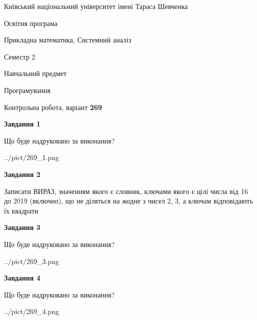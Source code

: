 \documentclass[12pt, ukrainian]{article}
\begin{document}
{{\begin {small}\par
{ \center  Київський національний університет імені Тараса Шевченка \par}
{\parbox {5 cm}{Освітня програма \hfill}{\parbox {8 cm}{Прикладна математика, Системний аналіз \hfill}}\parbox {5 cm}{\hfill Семестр 2}}\par
{\parbox {5 cm} {Навчальний предмет \hfill}\parbox {7 cm}{Програмування \hfill}\parbox {6cm}{\hfill}\par}\vspace{-7pt} \end{small}}{\center Контрольна робота, варіант  \No \textbf
{ 269 }\par}}
{
\begin {large}
{\begin {center}\textbf{Завдання 1}\end {center}}\par
Що буде надруковано за виконання?\par\par
\begin{center}
	{../pict/269_1.png}
\end{center}
\newpage

{\begin {center}\textbf{Завдання 2}\end {center}}\par
Записати ВИРАЗ, значенням якого є словник, ключами якого є цілі числа від 16 до 2019 (включно), що не діляться на жодне з чисел 2, 3, а ключам відповідають їх квадрати\par
\newpage

{\begin {center}\textbf{Завдання 3}\end {center}}\par
Що буде надруковано за виконання?
\begin{center}
	{../pict/269_3.png}
\end{center}
\newpage

{\begin {center}\textbf{Завдання 4}\end {center}}\par
Що буде надруковано за виконання?\par
\begin{center}
	{../pict/269_4.png}
\end{center}
\newpage


\end{large}}
\end{document}
